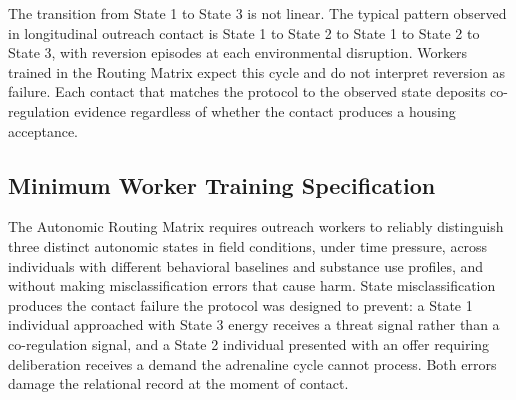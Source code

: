 \documentclass[12pt, letterpaper]{article}
\begin{document}
The transition from State 1 to State 3 is not linear. The typical pattern observed in longitudinal outreach contact is State 1 to State 2 to State 1 to State 2 to State 3, with reversion episodes at each environmental disruption. Workers trained in the Routing Matrix expect this cycle and do not interpret reversion as failure. Each contact that matches the protocol to the observed state deposits co-regulation evidence regardless of whether the contact produces a housing acceptance.

\subsection{Minimum Worker Training Specification}

The Autonomic Routing Matrix requires outreach workers to reliably distinguish three distinct autonomic states in field conditions, under time pressure, across individuals with different behavioral baselines and substance use profiles, and without making misclassification errors that cause harm. State misclassification produces the contact failure the protocol was designed to prevent: a State 1 individual approached with State 3 energy receives a threat signal rather than a co-regulation signal, and a State 2 individual presented with an offer requiring deliberation receives a demand the adrenaline cycle cannot process. Both errors damage the relational record at the moment of contact.
\end{document}
